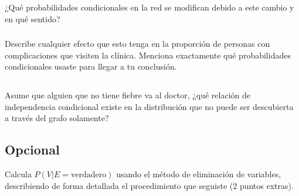 \documentclass[12pt]{article}
\begin{document}
\subsubsection{} ¿Qué probabilidades condicionales en la red se modifican debido a este cambio y en qué sentido?
\subsubsection{} Describe cualquier efecto que esto tenga en la proporción de personas con complicaciones que visiten la clínica. Menciona exactamente qué probabilidades condicionales usaste para llegar a tu conclusión.
\subsection{} Asume que alguien que no tiene fiebre va al doctor, ¿qué relación de independencia condicional existe en la distribución que no puede ser descubierta a través del grafo solamente?
 \subsection{Opcional} Calcula $P(V|E=\text{verdadero})$ usando el método de eliminación de variables, describiendo de forma detallada el procedimiento que seguiste (2 puntos extras).
\end{document}
